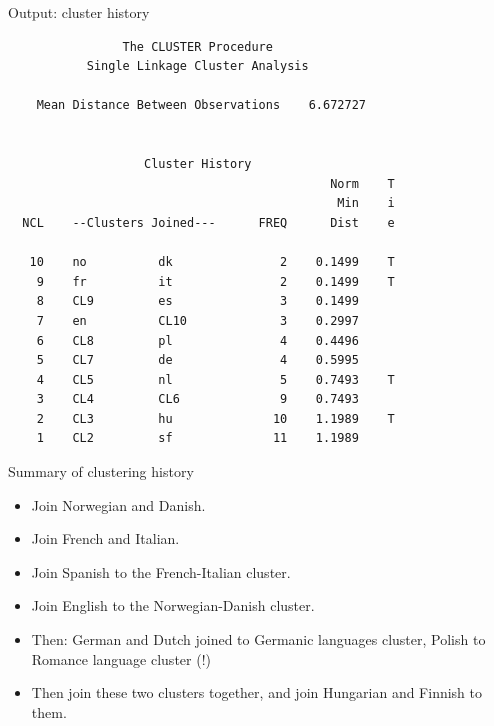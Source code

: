 \documentclass[pdf]{prosper}
\begin{document}
\begin{slide}{Output: cluster history}
  
{\scriptsize
\begin{verbatim}
                The CLUSTER Procedure
           Single Linkage Cluster Analysis

    Mean Distance Between Observations    6.672727


                   Cluster History
                                             Norm    T
                                              Min    i
  NCL    --Clusters Joined---      FREQ      Dist    e

   10    no          dk               2    0.1499    T
    9    fr          it               2    0.1499    T
    8    CL9         es               3    0.1499
    7    en          CL10             3    0.2997
    6    CL8         pl               4    0.4496
    5    CL7         de               4    0.5995
    4    CL5         nl               5    0.7493    T
    3    CL4         CL6              9    0.7493
    2    CL3         hu              10    1.1989    T
    1    CL2         sf              11    1.1989

\end{verbatim}
}

\end{slide}

\begin{slide}{Summary of clustering history}

  \begin{itemize}
  \item Join Norwegian and Danish.
  \item Join French and Italian.
  \item Join Spanish to the French-Italian cluster.
  \item Join English to the Norwegian-Danish cluster.
  \item Then: German and Dutch joined to Germanic languages cluster, Polish to Romance language cluster (!)
  \item Then join these two clusters together, and join Hungarian and Finnish to them.
  \end{itemize}

  
\end{slide}
\end{document}

